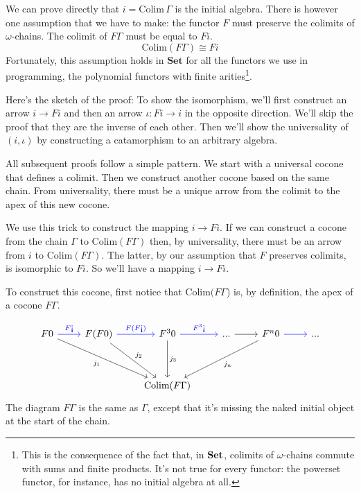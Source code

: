 \documentclass[DaoFP]{subfiles}
\begin{document}
We can  prove directly that $i = \text{Colim}\, \Gamma$ is the initial algebra. There is however one assumption that we have to make: the functor $F$ must preserve the colimits of $\omega$-chains. The colimit of $F \Gamma$ must be equal to $F i$.
\[ \text{Colim} (F \Gamma) \cong F i \]
Fortunately, this assumption holds in $\mathbf{Set}$ for all the functors we use in programming, the polynomial functors with finite arities\footnote{This is the consequence of the fact that, in $\mathbf{Set}$, colimits of $\omega$-chains commute with sums and finite products. It's not true for every functor: the powerset functor, for instance, has no initial algebra at all.}. 

Here's the sketch of the proof: To show the isomorphism, we'll first construct an arrow $i \to F i$ and then an arrow $\iota \colon F i \to i$ in the opposite direction. We'll skip the proof that they are the inverse of each other. Then we'll show the universality of $(i, \iota)$ by constructing a catamorphism to an arbitrary algebra.

All subsequent proofs follow a simple pattern. We start with a universal cocone that defines a colimit. Then we construct another cocone based on the same chain. From universality, there must be a unique arrow from the colimit to the apex of this new cocone.

We use this trick to construct the mapping $i \to F i$. If we can construct a cocone from the chain $\Gamma$ to $\text{Colim} (F \Gamma)$ then, by universality, there must be an arrow from $i$ to $\text{Colim} (F \Gamma)$. The latter, by our assumption that $F$ preserves colimits, is isomorphic to $F i$. So we'll have a mapping $i \to F i$.

To construct this cocone, first notice that $\text{Colim} (F \Gamma$) is, by definition, the apex of a cocone $F \Gamma$. 

\[
 \begin{tikzcd}
 F 0
 \arrow[r, blue, "F \mbox{!`}"]
 \arrow[ddrr, "j_1"']
 &  F (F 0)
  \arrow[r, blue, "F(F  \mbox{!`})"]
 \arrow[ddr, "j_2"]
& F^3 0
  \arrow[r, blue, "F^3\mbox{!`}"]
  \arrow[dd, "j_3"]
 & ...
 \arrow[r]
 & F^n 0
  \arrow[r, blue]
 \arrow[ddll, "j_n"]
 & ...
 \\
 \\
 &&\text{Colim} (F \Gamma)
  \end{tikzcd}
\]
The diagram $F \Gamma$ is the same as $\Gamma$, except that it's missing the naked initial object at the start of the chain.
\end{document}

